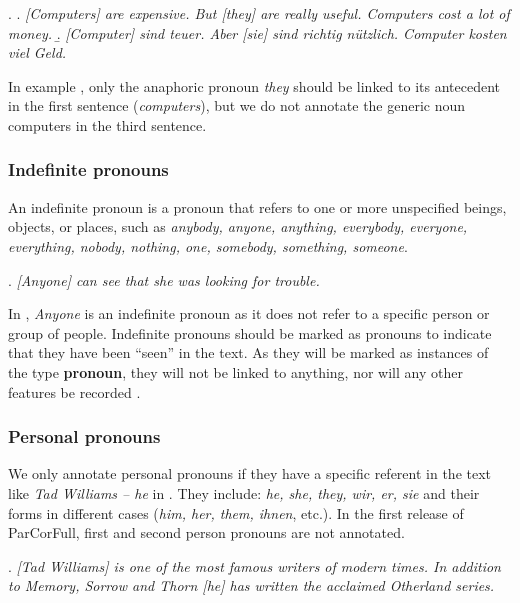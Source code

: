 \documentclass[a4paper]{article}
\begin{document}
\ex.
\a. {\sl [Computers] are expensive. But [they] are really useful. Computers cost a lot of money.}
\b.  {\sl  [Computer] sind teuer. Aber [sie] sind richtig nützlich. Computer kosten viel Geld.}

In example \Last, only the anaphoric pronoun {\sl they} should be linked to its antecedent in the first sentence ({\sl computers}), but we do not annotate the generic noun computers in the third sentence.

\subsubsection{Indefinite pronouns}

An indefinite pronoun is a pronoun that refers to one or more unspecified beings, objects, or places, such as {\sl anybody, anyone, anything, everybody, everyone, everything, nobody, nothing, one, somebody, something, someone}.

\ex. {\sl [Anyone] can see that she was looking for trouble.}

In \Last, {\sl Anyone} is an indefinite pronoun as it does not refer to a specific person or group of people. Indefinite pronouns should be marked as pronouns to indicate that they have been ``seen'' in the text. As they will be marked as instances of the type {\bf pronoun}, they will not be linked to anything, nor will any other features be recorded \cite[p. 9]{GuillouEtAlGuide}.

\subsubsection{Personal pronouns}

We only annotate personal pronouns if they have a specific referent in the text like {\sl Tad Williams -- he} in \Next. %
They include: {\sl he, she, they, wir, er, sie} and their forms in different cases ({\sl him, her, them, ihnen}, etc.). In the first release of ParCorFull, first and second person pronouns are not annotated.

\ex.
{\sl [Tad Williams] is one of the most famous writers of modern times. In addition to Memory, Sorrow and Thorn [he] has written the acclaimed Otherland series.}
\end{document}
